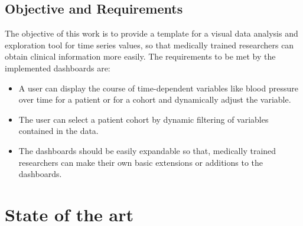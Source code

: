 \documentclass[aac,crcready]{iosart2x}
\begin{document}
\subsection{Objective and Requirements}\label{s1.2}
The objective of this work is to provide a template for a visual data analysis and exploration tool for time series values, so that medically trained researchers can obtain clinical information more easily.
The requirements to be met by the implemented dashboards are:
\begin{itemize}
\item A user can display the course of time-dependent variables like blood pressure over time for a patient or for a cohort and dynamically adjust the variable.
\item The user can select a patient cohort by dynamic filtering of variables contained in the data.
\item The dashboards should be easily expandable so that, medically trained researchers can make their own basic extensions or additions to the dashboards.
\end{itemize}

\section{State of the art}\label{s2}
\end{document}

